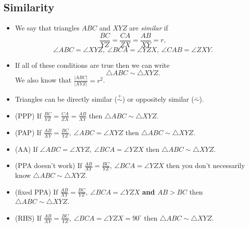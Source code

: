 \documentclass{article}
\begin{document}
  \subsection{Similarity}
  \begin{itemize}
    \item We say that triangles $ABC$ and $XYZ$ are \emph{similar} if
      \[\frac{BC}{YZ}=\frac{CA}{ZX}=\frac{AB}{XY}=r,\]
      \[\angle ABC=\angle XYZ,\
      \angle BCA=\angle YZX,\ \angle CAB=\angle ZXY.\]

    \item If all of these conditions are true then we can write \[\triangle
      ABC\sim\triangle XYZ.\] We also know that $\frac{|ABC|}{|XYZ|}=r^2$.

    \item Triangles can be directly similar ($\overset +\sim$) or oppositely
      similar ($\overset -\sim$).

    \item (PPP) If $\frac{BC}{YZ}=\frac{CA}{ZX}=\frac{AB}{XY}$ then $\triangle ABC\sim\triangle XYZ$.
    \item (PAP) If $\frac{AB}{XY}=\frac{BC}{YZ},\ \angle ABC=\angle XYZ$ then $\triangle
      ABC\sim\triangle XYZ$.
    \item (AA) If $\angle ABC=\angle XYZ,\ \angle BCA=\angle YZX$ then $\triangle
      ABC\sim\triangle XYZ$.
    \item (PPA doesn't work) If $\frac{AB}{XY}=\frac{BC}{YZ},\ \angle BCA=\angle YZX$ then you don't necessarily know
      $\triangle ABC\sim\triangle XYZ$.
    \item (fixed PPA) If $\frac{AB}{XY}=\frac{BC}{YZ},\ \angle BCA=\angle YZX$ \textbf{and $AB>BC$} then
      $\triangle ABC\sim\triangle XYZ$.
    \item (RHS) If $\frac{AB}{XY}=\frac{BC}{YZ},\ \angle BCA=\angle YZX=90^\circ$ then $\triangle
      ABC\sim\triangle XYZ$.
  \end{itemize}
\end{document}
